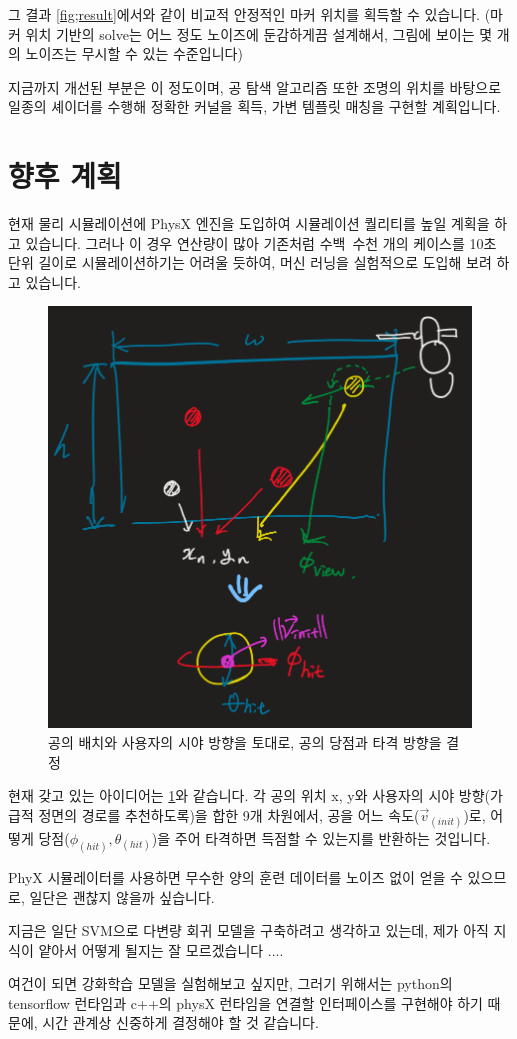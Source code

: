 \documentclass[10pt]{oblivoir}
\begin{document}
그 결과 \cref{fig;result}에서와 같이 비교적 안정적인 마커 위치를 획득할 수 있습니다. (마커 위치 기반의 solve는 어느 정도 노이즈에 둔감하게끔 설계해서, 그림에 보이는 몇 개의 노이즈는 무시할 수 있는 수준입니다)

지금까지 개선된 부분은 이 정도이며, 공 탐색 알고리즘 또한 조명의 위치를 바탕으로 일종의 셰이더를 수행해 정확한 커널을 획득, 가변 템플릿 매칭을 구현할 계획입니다.

\section{향후 계획}

현재 물리 시뮬레이션에 PhysX 엔진을 도입하여 시뮬레이션 퀄리티를 높일 계획을 하고 있습니다. 그러나 이 경우 연산량이 많아 기존처럼 수백~수천 개의 케이스를 10초 단위 길이로 시뮬레이션하기는 어려울 듯하여, 머신 러닝을 실험적으로 도입해 보려 하고 있습니다. 

\begin{figure}[H]
    \centering
    \includegraphics[width=\textwidth]{img/params.png}
    \caption{공의 배치와 사용자의 시야 방향을 토대로, 공의 당점과 타격 방향을 결정}
    \label{fig;params}
\end{figure}

현재 갖고 있는 아이디어는 \cref{fig;params}와 같습니다. 각 공의 위치 x, y와 사용자의 시야 방향(가급적 정면의 경로를 추천하도록)을 합한 9개 차원에서, 공을 어느 속도($\vec{v}_{(init)}$)로, 어떻게 당점($\phi_{(hit)}, \theta_{(hit)}$)을 주어 타격하면 득점할 수 있는지를 반환하는 것입니다.

PhyX 시뮬레이터를 사용하면 무수한 양의 훈련 데이터를 노이즈 없이 얻을 수 있으므로, 일단은 괜찮지 않을까 싶습니다.

지금은 일단 SVM으로 다변량 회귀 모델을 구축하려고 생각하고 있는데, 제가 아직 지식이 얕아서 어떻게 될지는 잘 모르겠습니다 ....

여건이 되면 강화학습 모델을 실험해보고 싶지만, 그러기 위해서는 python의 tensorflow 런타임과 c++의 physX 런타임을 연결할 인터페이스를 구현해야 하기 때문에, 시간 관계상 신중하게 결정해야 할 것 같습니다.
\end{document}
